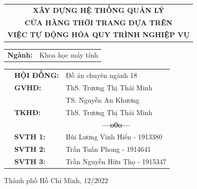 \documentclass[a4paper, twoside, 12pt]{report}
\theoremstyle{definition}
\newcommand{\setupfont}[1]{\fontsize{#1}{#1}\selectfont}
\begin{document}
\begin{titlepage}
\vspace*{0.5cm}

\begin{center}
\setupfont{17pt}
	\begin{tabular}{c}
	\textbf{{XÂY DỰNG HỆ THỐNG QUẢN LÝ}}\\
	\textbf{{CỬA HÀNG THỜI TRANG DỰA TRÊN}}\\
	\textbf{{VIỆC TỰ ĐỘNG HÓA QUY TRÌNH NGHIỆP VỤ}}
	\end{tabular}
\end{center}

\vspace{0.5cm}


\begin{center}
	\setupfont{14pt}
	\begin{tabular}{rl}
		\textbf{Ngành:} & Khoa học máy tính
	\end{tabular}
\end{center}

\vspace{1cm}

\begin{table}[h]
	\setupfont{13pt}
\begin{tabular}{rll}
\hspace{5 cm}	& \textbf{HỘI ĐỒNG:} 	& Đồ án chuyên ngành 18   \\
				& \textbf{GVHD:} 		& ThS. Trương Thị Thái Minh\\
				&						& TS. Nguyễn An Khương\\
				& \textbf{TKHĐ:}		& ThS. Trương Thị Thái Minh\\
				&&\multicolumn{1}{c}{\bf---o0o---}\vspace{2mm}\\
				& \textbf{SVTH 1:} 		& Bùi Lương Vinh Hiển - 1913380       \\
				& \textbf{SVTH 2:} 		& Trần Tuấn Phong - 1914641       \\
				& \textbf{SVTH 3:} 		& Trần Nguyễn Hữu Thọ - 1915347       \\
\end{tabular}
\end{table}

\begin{center}
{\setupfont{12pt} Thành phố Hồ Chí Minh, 12/2022}
\end{center}
\end{titlepage}

\setupfont{13pt}

\clearpage
\thispagestyle{empty}
\hfill
\clearpage
\end{document}
